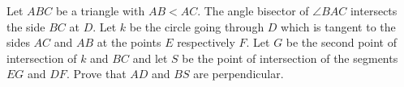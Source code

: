 Let $ABC$ be a triangle with $AB < AC$. The angle bisector of $\angle BAC$ intersects the side $BC$ at $D$. Let $k$ be the circle going through $D$ which is tangent to the sides $AC$ and $AB$ at the points $E$ respectively $F$. Let $G$ be the second point of intersection of $k$ and $BC$ and let $S$ be the point of intersection of the segments $EG$ and $DF$. Prove that $AD$ and $BS$ are perpendicular.